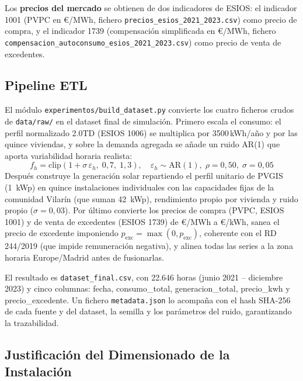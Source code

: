 \documentclass[12pt, a4paper, twoside]{report}
\begin{document}
Los \textbf{precios del mercado} se obtienen de dos indicadores de ESIOS:
el indicador 1001 (PVPC en €/MWh, fichero \texttt{precios\_esios\_2021\_2023.csv})
como precio de compra, y el indicador 1739 (compensación simplificada en €/MWh,
fichero \texttt{compensacion\_autoconsumo\_esios\_2021\_2023.csv}) como precio
de venta de excedentes.

\subsection{Pipeline ETL}

El módulo \texttt{experimentos/build\_dataset.py} convierte los cuatro
ficheros crudos de \texttt{data/raw/} en el dataset final de simulación.
Primero escala el consumo: el perfil normalizado 2.0TD (ESIOS 1006) se
multiplica por \num{3500}\,kWh/año y por las quince viviendas, y sobre la
demanda agregada se añade un ruido AR(1) que aporta variabilidad horaria
realista:
\begin{equation}
  f_h = \text{clip}(1 + \sigma\,\varepsilon_h,\; 0{,}7,\; 1{,}3),
  \quad \varepsilon_h \sim \text{AR}(1),\; \rho=0{,}50,\; \sigma=0{,}05
  \label{eq:ar1}
\end{equation}
Después construye la generación solar repartiendo el perfil unitario de PVGIS
(\SI{1}{kWp}) en quince instalaciones individuales con las capacidades fijas de
la comunidad Vilarín (que suman \SI{42}{kWp}), rendimiento propio por vivienda y
ruido propio ($\sigma=0{,}03$). Por último convierte los precios de compra
(PVPC, ESIOS 1001) y de venta de excedentes (ESIOS 1739) de €/MWh a €/kWh,
sanea el precio de excedente imponiendo
$p_{\text{exc}} = \max(0, p_{\text{exc}})$, coherente con el RD 244/2019 (que
impide remuneración negativa), y alinea todas las series a la zona horaria
Europe/Madrid antes de fusionarlas.

El resultado es \texttt{dataset\_final.csv}, con 22.646 horas (junio 2021 --
diciembre 2023) y cinco columnas: fecha, consumo\_total, generacion\_total,
precio\_kwh y precio\_excedente. Un fichero \texttt{metadata.json} lo acompaña
con el hash SHA-256 de cada fuente y del dataset, la semilla y los parámetros
del ruido, garantizando la trazabilidad.

\subsection{Justificación del Dimensionado de la Instalación}
\label{sub:dimensionado}
\end{document}
